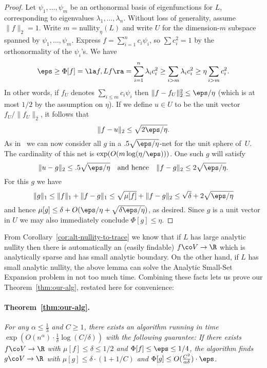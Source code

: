 \documentclass[11pt]{article}
\newcommand{\Bdry}{\Phi}
\newcommand{\Spars}{\mu}
\newcommand{\nullity}{\mathrm{nullity}}
\begin{document}
\begin{proof}
    Let $\psi_1, \dots, \psi_m$ be an orthonormal basis of eigenfunctions for $L$, corresponding to eigenvalues $\lambda_1, \dots, \lambda_n$.  Without loss of generality, assume $\|f\|_2 = 1$.  Write $m = \nullity_\eta(L)$ and write $U$ for the dimension-$m$ subspace spanned by $\psi_1, \dots, \psi_m$.  Express $f = \sum_{i=1}^{n} c_i \psi_i$, so $\sum c_i^2 =1$ by the orthonormality of the $\psi_i$'s.  We have
    \[
        \eps \geq \Bdry[f] = \la f, L f \ra = \sum_{i=1}^{n} \lambda_i c_i^2 \geq \sum_{i> m} \lambda_i c_i^2 \geq \eta \sum_{i > m} c_i^2. \]
    In other words, if $f_U$ denotes $\sum_{i \leq m} c_i \psi_i $ then $\|f - f_U\|_2^2 \leq \eps/\eta$ (which is at most $1/2$ by the assumption on $\eta$).  If we define $u \in U$ to be the unit vector $f_U/\|f_U\|_2$, it follows that
    \[
        \|f - u\|_2 \leq \sqrt{2\eps/\eta}.
    \]
    As in~\cite{ABS10} we can now consider all $g$ in a $.5\sqrt{\eps/\eta}$-net for the unit sphere of~$U$. The cardinality of this net is $\exp(O(m \log(\eta/\eps)))$.  One such $g$ will satisfy
    \[
        \|u - g\|_2 \leq .5\sqrt{\eps/\eta} \quad \text{and hence} \quad \|f - g\|_2 \leq 2\sqrt{\eps/\eta}.
    \]
    For this $g$ we have
    \[
        \|g\|_1 \leq \|f\|_1 + \|f - g\|_1 \leq \sqrt{\Spars[f]} + \|f-g\|_2 \leq \sqrt{\delta} + 2\sqrt{\eps/\eta}
    \]
    and hence $\Spars[g] \leq \delta + O(\eps/\eta + \sqrt{\delta \eps/\eta})$, as desired.  Since $g$ is a unit vector in $U$ we may also immediately conclude $\Bdry[g] \leq \eta$.
\end{proof}

From Corollary~\ref{cor:alt-nullity-to-trace} we know that if $L$ has large analytic nullity then there is automatically an (easily findable) $f \co V \to \R$ which is analytically sparse and has small analytic boundary.  On the other hand, if $L$ has small analytic nullity, the above lemma can solve the Analytic Small-Set Expansion problem in not too much time.  Combining these facts lets us prove our Theorem~\ref{thm:our-alg}, restated here for convenience:
\paragraph{Theorem~\ref{thm:our-alg}.} \emph{For any $\alpha \leq \frac13$ and $C \geq 1$, there exists an algorithm running in time $\exp(O(n^\alpha) \cdot\tfrac{1}{\delta}\log(C/\delta))$ with the following guarantee:  If there exists $f \co V \to \R$ with $\Spars[f] \leq \delta \leq 1/2$ and $\Bdry[f] \leq \eps \leq 1/4$, the algorithm finds $g \co V \to \R$ with $\Spars[g] \leq \delta \cdot(1+1/C)$ and $\Bdry[g] \leq O(\frac{C^2}{\alpha \delta}) \cdot \eps$.}
\end{document}
